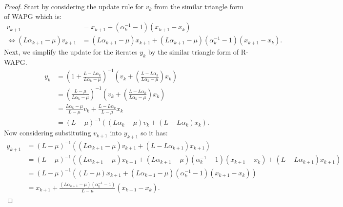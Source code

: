 \documentclass[12pt]{article}
\begin{document}
    \begin{proof}
        Start by considering the update rule for $v_k$ from the similar triangle form of WAPG which is: 
        \begin{align*}
            v_{k + 1} &= 
            x_{k + 1} + (\alpha_k^{-1} - 1)(x_{k + 1} - x_k)
            \\
            \iff 
            (L \alpha_{k + 1} - \mu)v_{k + 1} 
            &= 
            (L \alpha_{k + 1} - \mu)x_{k + 1} + (L\alpha_{k + 1} - \mu)(\alpha_k^{-1} - 1)(x_{k + 1} - x_k). 
        \end{align*}
        Next, we simplify the update for the iterates $y_{k}$ by the similar triangle form of R-WAPG. 
        \begin{align*}
            y_k &= 
            \left(
                1 + \frac{L - L\alpha_k}{L\alpha_k - \mu}
            \right)^{-1}
            \left(
                v_k + 
                \left(\frac{L - L\alpha_k}{L\alpha_k - \mu} \right) x_k
            \right)
            \\
            &= 
            \left(
            \frac{L - \mu}{L\alpha_k - \mu} 
            \right)^{-1}
            \left(
                v_k + 
                \left(\frac{L - L\alpha_k}{L\alpha_k - \mu} \right) x_k
            \right)
            \\
            &= 
            \frac{L\alpha_k - \mu}{L - \mu} v_k
            + 
            \frac{L - L \alpha_k}{L - \mu} x_k
            \\
            &= (L - \mu)^{-1}((L \alpha_k - \mu)v_k + (L - L \alpha_k)x_k). 
        \end{align*}
        Now considering substituting $v_{k + 1}$ into $y_{k + 1}$ so it has: 
        {\small
        \begin{align*}
            y_{k + 1} &= 
            (L - \mu)^{-1}((L\alpha_{k + 1} - \mu)v_{k + 1} + (L - L \alpha_{k + 1})x_{k + 1})
            \\
            &= (L - \mu)^{-1}
            \left(
                (L\alpha_{k + 1} - \mu)x_{k + 1} + 
                (L\alpha_{k + 1} - \mu)(\alpha_k^{-1} - 1)(x_{k + 1} - x_k)
                + (L - L \alpha_{k + 1})x_{k + 1}
            \right)
            \\
            &= 
            (L - \mu)^{-1}
            \left(
                (L - \mu)x_{k + 1} + (L\alpha_{k + 1} - \mu)(\alpha_k^{-1} - 1)(x_{k + 1} - x_k)
            \right)
            \\
            &= x_{k + 1} + \frac{(L\alpha_{k + 1} - \mu)(\alpha_k^{-1} - 1)}{L - \mu}(x_{k + 1} - x_k). 
        \end{align*}
        }


\end{proof}
\end{document}
